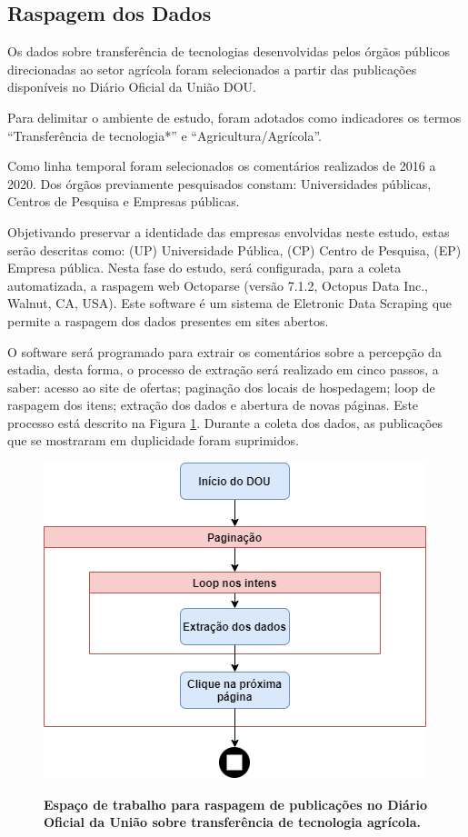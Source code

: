 \subsection{Raspagem dos Dados}

Os dados sobre transferência de tecnologias desenvolvidas pelos órgãos públicos direcionadas ao setor agrícola foram selecionados a partir das publicações disponíveis no Diário Oficial da União DOU.

Para delimitar o ambiente de estudo, foram adotados como indicadores os termos “Transferência de tecnologia*” e “Agricultura/Agrícola”. 

Como linha temporal foram selecionados os comentários realizados de 2016 a 2020. Dos órgãos previamente pesquisados  constam: Universidades públicas, Centros de Pesquisa e Empresas públicas.

Objetivando preservar a identidade das empresas envolvidas neste estudo, estas serão descritas como: (UP) Universidade Pública, (CP) Centro de Pesquisa, (EP) Empresa pública.
Nesta fase do  estudo, será configurada, para a coleta automatizada, a raspagem web Octoparse (versão 7.1.2, Octopus Data Inc., Walnut, CA, USA). Este software é um sistema de Eletronic Data Scraping que permite a raspagem dos dados presentes em sites abertos. 

O software será programado para extrair os comentários sobre a percepção da estadia, desta forma, o processo de extração será realizado em cinco passos, a saber: acesso ao site de ofertas; paginação dos locais de hospedagem; loop de raspagem dos itens; extração dos dados e abertura de novas páginas. Este processo está descrito na Figura \ref{figura_raspagem}. Durante a coleta dos dados, as publicações que se mostraram em duplicidade foram suprimidos. 



\begin{figure}[H]
\centering
\caption{\textbf{Espaço de trabalho para raspagem de publicações no Diário Oficial da União sobre transferência de tecnologia agrícola.
}}
\includegraphics[scale=0.6]{Imagens/raspagem.png}
\label{figura_raspagem}
\end{figure}


